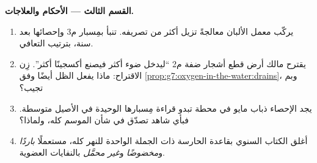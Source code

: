 \begin{problem}
\medskip\noindent\textbf{القسم الثالث --- الأحكام
والعلاجات.}
\begin{enumerate}[resume]
  \item يركّب معمل الألبان معالجةً تزيل أكثر  من
        تصريفه. تنبأ بمِسبار م3 وإحصائها بعد سنة، بترتيب
        التعافي.
  \item يقترح مالك أرض قطع أشجار ضفة م2 ``ليدخل ضوء أكثر فيصنع
        أكسجينًا أكثر''. زِن الاقتراح: ماذا يفعل الظل أيضًا وفق
        \cref{prop:g7:oxygen-in-the-water:drains}، وبم تجيب؟
  \item يجد الإحصاء  ذباب مايو في محطة تبدو قراءة مِسبارها
        الوحيدة في الأصيل متوسطة. فبأي شاهد تصدّق في شأن الموسم
        كله، ولماذا؟
  \item أغلق الكتاب السنوي بقاعدة الحارسة ذات الجملة الواحدة
        للنهر كله، مستعملًا \emph{باردًا} و\emph{مخضوضًا}
        و\emph{غير محمَّل} بالنفايات العضوية.
\end{enumerate}
\end{problem}
